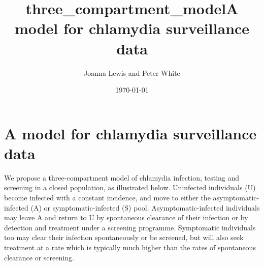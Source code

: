 \documentclass{article}
\title{three\_compartment\_model}
\begin{document}
    
    
    \author{Joanna Lewis and Peter White}\title{A model for chlamydia surveillance data}

\date{\today}
\maketitle

\tableofcontents


    
    

    
    \section{A model for chlamydia surveillance
data}\label{a-model-for-chlamydia-surveillance-data}

We propose a three-compartment model of chlamydia infection, testing and
screening in a closed population, as illustrated below. Uninfected
individuals (U) become infected with a constant incidence, and move to
either the asymptomatic-infected (A) or symptomatic-infected (S) pool.
Asymptomatic-infected individuals may leave A and return to U by
spontaneous clearance of their infection or by detection and treatment
under a screening programme. Symptomatic individuals too may clear their
infection spontaneously or be screened, but will also seek treatment at
a rate which is typically much higher than the rates of spontaneous
clearance or screening.
\end{document}
